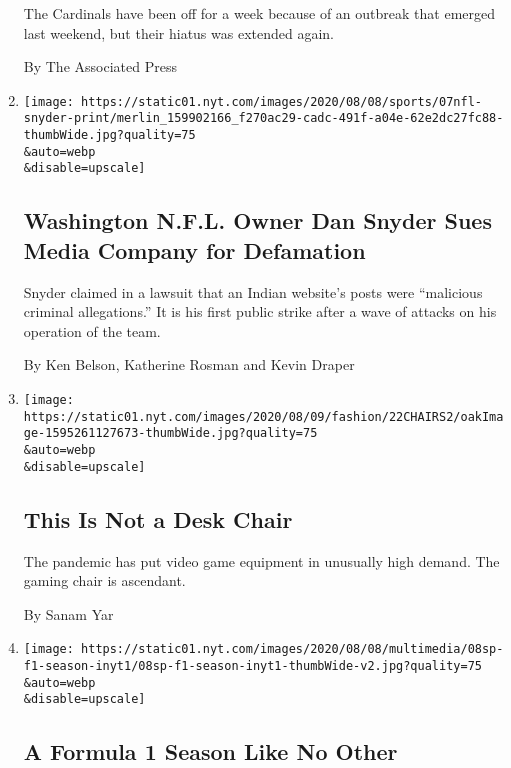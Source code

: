 \begin{enumerate}
  The Cardinals have been off for a week because of an outbreak that
  emerged last weekend, but their hiatus was extended again.

  By The Associated Press
\item
  \href{/2020/08/07/sports/dan-snyder-washington-nfl-defamation-lawsuit.html}{}

  \texttt{[image: https://static01.nyt.com/images/2020/08/08/sports/07nfl-snyder-print/merlin\_159902166\_f270ac29-cadc-491f-a04e-62e2dc27fc88-thumbWide.jpg?quality=75\\\&auto=webp\\\&disable=upscale]}

  \hypertarget{washington-nfl-owner-dan-snyder-sues-media-company-for-defamation}{%
  \subsection{Washington N.F.L. Owner Dan Snyder Sues Media Company for
  Defamation}\label{washington-nfl-owner-dan-snyder-sues-media-company-for-defamation}}

  Snyder claimed in a lawsuit that an Indian website's posts were
  ``malicious criminal allegations.'' It is his first public strike
  after a wave of attacks on his operation of the team.

  By Ken Belson, Katherine Rosman and Kevin Draper
\item
  \href{/2020/08/07/style/gamer-chair-market-herman-miller.html}{}

  \texttt{[image: https://static01.nyt.com/images/2020/08/09/fashion/22CHAIRS2/oakImage-1595261127673-thumbWide.jpg?quality=75\\\&auto=webp\\\&disable=upscale]}

  \hypertarget{this-is-not-a-desk-chair}{%
  \subsection{This Is Not a Desk Chair}\label{this-is-not-a-desk-chair}}

  The pandemic has put video game equipment in unusually high demand.
  The gaming chair is ascendant.

  By Sanam Yar
\item
  \href{/2020/08/07/sports/autoracing/formula-1-season-coronavirus.html}{}

  \texttt{[image: https://static01.nyt.com/images/2020/08/08/multimedia/08sp-f1-season-inyt1/08sp-f1-season-inyt1-thumbWide-v2.jpg?quality=75\\\&auto=webp\\\&disable=upscale]}

  \hypertarget{a-formula-1-season-like-no-other}{%
  \subsection{A Formula 1 Season Like No
  Other}\label{a-formula-1-season-like-no-other}}


\end{enumerate}

